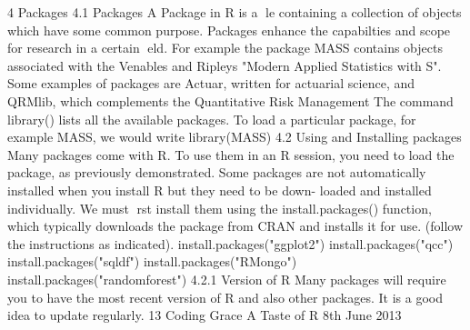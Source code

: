 4 Packages
4.1 Packages
A Package in R is a le containing a collection of objects which have some common purpose.
Packages enhance the capabilties and scope for research in a certain eld. For example the
package MASS contains objects associated with the Venables and Ripleys "Modern Applied
Statistics with S". Some examples of packages are Actuar, written for actuarial science, and
QRMlib, which complements the Quantitative Risk Management The command library()
lists all the available packages. To load a particular package, for example MASS, we would
write
library(MASS)
4.2 Using and Installing packages
Many packages come with R. To use them in an R session, you need to load the package, as
previously demonstrated.
Some packages are not automatically installed when you install R but they need to be down-
loaded and installed individually. We must rst install them using the install.packages()
function, which typically downloads the package from CRAN and installs it for use. (follow the
instructions as indicated).
install.packages("ggplot2")
install.packages("qcc")
install.packages("sqldf")
install.packages("RMongo")
install.packages("randomforest")
4.2.1 Version of R
Many packages will require you to have the most recent version of R and also other packages.
It is a good idea to update regularly.
13
Coding Grace A Taste of R 8th June 2013
